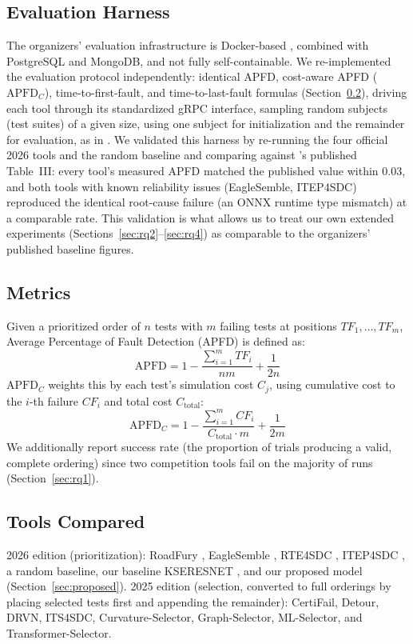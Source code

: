 \documentclass[smallextended]{svjour3}
\begin{document}
\subsection{Evaluation Harness}
\label{sec:harness}
The organizers' evaluation infrastructure is Docker-based
\citep{boettiger2015introduction}, combined with PostgreSQL and MongoDB,
and not fully self-containable. We re-implemented the evaluation protocol
independently: identical APFD, cost-aware APFD ($\mathrm{APFD}_C$),
time-to-first-fault, and time-to-last-fault formulas
(Section~\ref{sec:metrics}), driving each tool through its standardized
gRPC interface, sampling random subjects (test suites) of a given size,
using one subject for initialization and the remainder for evaluation, as
in \citet{aryan2026icst}. We validated this harness by re-running the four
official 2026 tools and the random baseline and comparing against
\citet{aryan2026icst}'s published Table~III: every tool's measured APFD
matched the published value within 0.03, and both tools with known
reliability issues (EagleSemble, ITEP4SDC) reproduced the identical
root-cause failure (an ONNX runtime type mismatch) at a comparable rate.
This validation is what allows us to treat our own extended experiments
(Sections~\ref{sec:rq2}--\ref{sec:rq4}) as comparable to the organizers'
published baseline figures.

\subsection{Metrics}
\label{sec:metrics}
Given a prioritized order of $n$ tests with $m$ failing tests at positions
$TF_1,\dots,TF_m$, Average Percentage of Fault Detection (APFD)
\citep{rothermel2001prioritizing} is defined as:
\begin{equation}
\mathrm{APFD} = 1 - \frac{\sum_{i=1}^{m} TF_i}{nm} + \frac{1}{2n}
\end{equation}
$\mathrm{APFD}_C$ weights this by each test's simulation cost $C_j$, using
cumulative cost to the $i$-th failure $CF_i$ and total cost $C_{\mathrm{total}}$:
\begin{equation}
\mathrm{APFD}_C = 1 - \frac{\sum_{i=1}^{m} CF_i}{C_{\mathrm{total}} \cdot m} + \frac{1}{2m}
\end{equation}
We additionally report success rate (the proportion of trials producing a
valid, complete ordering) since two competition tools fail on the majority
of runs (Section~\ref{sec:rq1}).

\subsection{Tools Compared}
2026 edition (prioritization): RoadFury \citep{tran2026roadfury},
EagleSemble \citep{aquilinoeaglesemble}, RTE4SDC \citep{maugeri2026rte4sdc},
ITEP4SDC \citep{gullu2026itep4sdc}, a random baseline, our baseline
KSERESNET \citep{swain2026kseresnet}, and our proposed model
(Section~\ref{sec:proposed}). 2025 edition (selection, converted to full
orderings by placing selected tests first and appending the remainder):
CertiFail, Detour, DRVN, ITS4SDC, Curvature-Selector, Graph-Selector,
ML-Selector, and Transformer-Selector.
\end{document}
